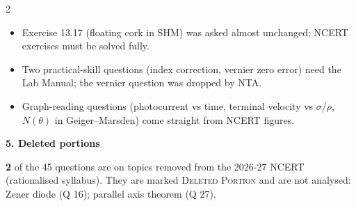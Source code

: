 \begin{multicols}{2}
{\begin{itemize}[leftmargin=1em,nosep]
\item Exercise 13.17 (floating cork in SHM) was asked almost unchanged; NCERT exercises must be solved fully.
\item Two practical-skill questions (index correction, vernier zero error) need the Lab Manual; the vernier question was dropped by NTA.
\item Graph-reading questions (photocurrent vs time, terminal velocity vs $\sigma/\rho$, $N(\theta)$ in Geiger--Marsden) come straight from NCERT figures.
\end{itemize}}\par\medskip
\textbf{\color{crimson}5. Deleted portions}\par\smallskip
\textbf{2} of the 45 questions are on topics removed from the 2026-27 NCERT (rationalised syllabus). They are marked \textsc{Deleted Portion} and are not analysed: Zener diode (Q 16); parallel axis theorem (Q 27).\par
\end{multicols}


